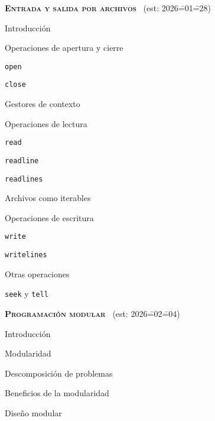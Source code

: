 \begin{longenum}
    \item \textbf{\textsc{Entrada y salida por archivos}} \ (est: 2026\==01\==28)
    \begin{longenum}
        \item Introducción
        \item Operaciones de apertura y cierre
        \begin{longenum}
            \item \texttt{open}
            \item \texttt{close}
            \item Gestores de contexto
        \end{longenum}
        \item Operaciones de lectura
        \begin{longenum}
            \item \texttt{read}
            \item \texttt{readline}
            \item \texttt{readlines}
            \item Archivos como iterables
        \end{longenum}
        \item Operaciones de escritura
        \begin{longenum}
            \item \texttt{write}
            \item \texttt{writelines}
        \end{longenum}
        \item Otras operaciones
        \begin{longenum}
            \item \texttt{seek} y \texttt{tell}
        \end{longenum}
    \end{longenum}
    \item \textbf{\textsc{Programación modular}} \ (est: 2026\==02\==04)
    \begin{longenum}
        \item Introducción
        \begin{longenum}
            \item Modularidad
            \item Descomposición de problemas
            \item Beneficios de la modularidad
        \end{longenum}
        \item Diseño modular
        \begin{longenum}

\end{longenum}
\end{longenum}
\end{longenum}
